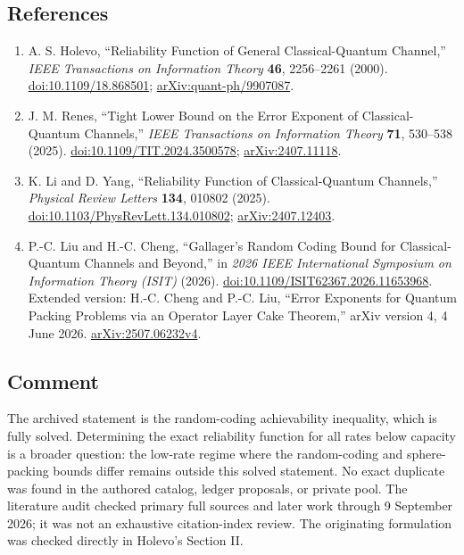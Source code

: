 \subsection*{References}

\begin{enumerate}[label={},leftmargin=4.8em,labelsep=0.5em]
  \footnotesize
  \item[\textup{[Hol00]}]\label{ref:cqrc-holevo}
  A. S. Holevo, ``Reliability Function of General Classical-Quantum Channel,'' \emph{IEEE Transactions on Information Theory} \textbf{46}, 2256–2261 (2000). \href{https://doi.org/10.1109/18.868501}{doi:10.1109/18.868501}; \href{https://arxiv.org/abs/quant-ph/9907087}{arXiv:quant-ph/9907087}.

  \item[\textup{[Ren25]}]\label{ref:cqrc-renes}
  J. M. Renes, ``Tight Lower Bound on the Error Exponent of Classical-Quantum Channels,'' \emph{IEEE Transactions on Information Theory} \textbf{71}, 530–538 (2025). \href{https://doi.org/10.1109/TIT.2024.3500578}{doi:10.1109/TIT.2024.3500578}; \href{https://arxiv.org/abs/2407.11118}{arXiv:2407.11118}.

  \item[\textup{[LY25]}]\label{ref:cqrc-liyang}
  K. Li and D. Yang, ``Reliability Function of Classical-Quantum Channels,'' \emph{Physical Review Letters} \textbf{134}, 010802 (2025). \href{https://doi.org/10.1103/PhysRevLett.134.010802}{doi:10.1103/PhysRevLett.134.010802}; \href{https://arxiv.org/abs/2407.12403}{arXiv:2407.12403}.

  \item[\textup{[CL26]}]\label{ref:cqrc-cheng-liu}
  P.-C. Liu and H.-C. Cheng, ``Gallager's Random Coding Bound for Classical-Quantum Channels and Beyond,'' in \emph{2026 IEEE International Symposium on Information Theory (ISIT)} (2026). \href{https://doi.org/10.1109/ISIT62367.2026.11653968}{doi:10.1109/ISIT62367.2026.11653968}. Extended version: H.-C. Cheng and P.-C. Liu, ``Error Exponents for Quantum Packing Problems via an Operator Layer Cake Theorem,'' arXiv version 4, 4 June 2026. \href{https://arxiv.org/abs/2507.06232v4}{arXiv:2507.06232v4}.
\end{enumerate}

\subsection*{Comment}

The archived statement is the random-coding achievability inequality, which is fully solved. Determining the exact reliability function for all rates below capacity is a broader question: the low-rate regime where the random-coding and sphere-packing bounds differ remains outside this solved statement. No exact duplicate was found in the authored catalog, ledger proposals, or private pool. The literature audit checked primary full sources and later work through 9 September 2026; it was not an exhaustive citation-index review. The originating formulation was checked directly in Holevo's Section II.

